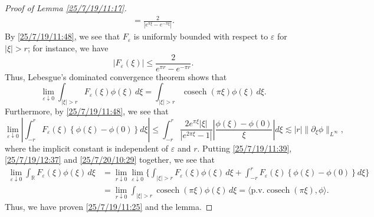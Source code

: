 \documentclass{amsart}
\numberwithin{equation}{section}
\newcommand{\pv}{\textrm{p.v.}}
\begin{document}
\begin{proof}[Proof of Lemma \ref{25/7/19/11:17}]
\begin{equation}
\begin{aligned}
{}=\frac{2 }{|e^{\pi \xi } - e^{-\pi \xi}|}.  
\end{aligned} 
\end{equation}
By \eqref{25/7/19/11:48}, we see that $F_{\varepsilon}$ is uniformly bounded with respect to $\varepsilon$ for $|\xi|>r$; for instance, we have 
\[ \left| F_{\varepsilon}(\xi) \right| \leq \frac{2}{e^{\pi r } - e^{-\pi r}}. \]
Thus, Lebesgue's dominated convergence theorem shows that 
\begin{equation}\label{25/7/19/12:37}
\lim_{\varepsilon \downarrow 0}\int_{|\xi|>r} F_{\varepsilon}(\xi) \phi(\xi) \,d\xi 
=\int_{|\xi|>r}\operatorname{cosech}{(\pi \xi)}\phi(\xi)\,d\xi. 
\end{equation}
Furthermore, by \eqref{25/7/19/11:48}, we see that
\begin{equation}\label{25/7/20/10:29}
\lim_{\varepsilon \downarrow 0}\left| \int_{-r}^{r} F_{\varepsilon}(\xi) \left\{ \phi(\xi) -\phi(0) \right\} d\xi \right| 
\leq \int_{-r}^{r} \frac{2e^{\pi \xi} |\xi|}{|e^{2\pi \xi} - 1|}\left| \frac{\phi(\xi) -\phi(0)}{\xi} \right| d\xi 
\lesssim |r| \| \partial_\xi \phi \|_{L^{\infty}},
\end{equation}
where the implicit constant is independent of $\varepsilon$ and $r$. 
Putting \eqref{25/7/19/11:39}, \eqref{25/7/19/12:37} and \eqref{25/7/20/10:29} together, we see that 
\begin{equation}\label{25/7/19/12:55}
\begin{aligned}
\lim_{\varepsilon \downarrow 0}\int_{\mathbb{R}} F_{\varepsilon}(\xi) \phi(\xi) \,d\xi 
&=\lim_{r\downarrow 0} \lim_{\varepsilon \downarrow 0}\bigg\{ 
\int_{|\xi|>r} F_{\varepsilon}(\xi) \phi(\xi) \,d\xi +
\int_{-r}^{r} F_{\varepsilon}(\xi) \left\{ \phi(\xi) -\phi(0) \right\} d\xi \bigg\} \\
&=\lim_{r\downarrow 0}\int_{|\xi|>r}\operatorname{cosech}{(\pi \xi)}\phi(\xi)\,d\xi=\langle \pv\operatorname{cosech}{(\pi \xi)}, \phi \rangle.
\end{aligned} 
\end{equation}
Thus, we have proven \eqref{25/7/19/11:25} and the lemma. 
\end{proof}
\end{document}
